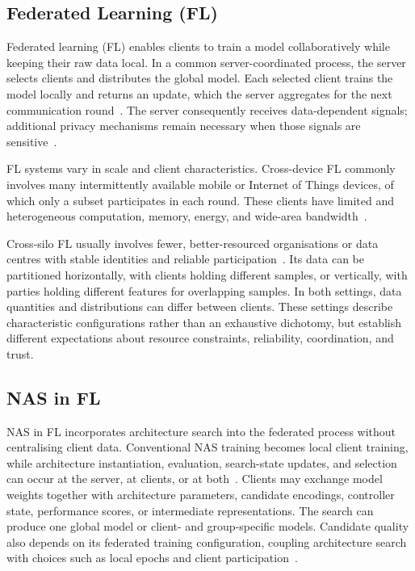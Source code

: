 \subsection{Federated Learning (FL)}

Federated learning (FL) enables clients to train a model collaboratively while keeping their raw data local. In a common server-coordinated process, the server selects clients and distributes the global model. Each selected client trains the model locally and returns an update, which the server aggregates for the next communication round~\cite{fl_seminal_2017}. The server consequently receives data-dependent signals; additional privacy mechanisms remain necessary when those signals are sensitive~\cite{fl_advances_and_open_problems_2021}.

FL systems vary in scale and client characteristics. Cross-device FL commonly involves many intermittently available mobile or Internet of Things devices, of which only a subset participates in each round. These clients have limited and heterogeneous computation, memory, energy, and wide-area bandwidth~\cite{fl_advances_and_open_problems_2021}.

Cross-silo FL usually involves fewer, better-resourced organisations or data centres with stable identities and reliable participation~\cite{fl_advances_and_open_problems_2021}. Its data can be partitioned horizontally, with clients holding different samples, or vertically, with parties holding different features for overlapping samples. In both settings, data quantities and distributions can differ between clients. These settings describe characteristic configurations rather than an exhaustive dichotomy, but establish different expectations about resource constraints, reliability, coordination, and trust.

\subsection{NAS in FL}

NAS in FL incorporates architecture search into the federated process without centralising client data. Conventional NAS training becomes local client training, while architecture instantiation, evaluation, search-state updates, and selection can occur at the server, at clients, or at both~\cite{nas_in_fl_2026}. Clients may exchange model weights together with architecture parameters, candidate encodings, controller state, performance scores, or intermediate representations. The search can produce one global model or client- and group-specific models. Candidate quality also depends on its federated training configuration, coupling architecture search with choices such as local epochs and client participation~\cite{nas_in_fl_2026}.

